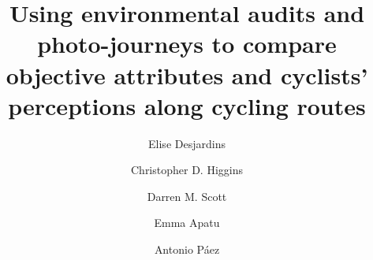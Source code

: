 \documentclass[]{elsarticle} %
\begin{document}
\begin{frontmatter}

  \title{Using environmental audits and photo-journeys to compare objective
attributes and cyclists' perceptions along cycling routes}
    \author[School of Geography and Earth Sciences]{Elise Desjardins}
    \author[Department of Human Geography]{Christopher D. Higgins}
    \author[School of Geography and Earth Sciences]{Darren M. Scott}
    \author[Department of Health Research Methods Evidence and Impact]{Emma Apatu}
    \author[School of Geography and Earth Sciences]{Antonio Páez}
      \address[School of Geography and Earth Sciences]{School of Geography and Earth Sciences, McMaster University, 1280 Main
Street West, Hamilton, Ontario L8S 4K1}
    \address[Department of Human Geography]{Department of Human Geography, University of Toronto - Scarborough, 1265
Military Trail, Toronto, Ontario M1C 1A4}
    \address[Department of Health Research Methods Evidence and Impact]{Department of Health Research Methods, Evidence, and Impact, McMaster
University, 1280 Main Street West, Hamilton, Ontario L8S 4K1}
  

\end{frontmatter}
\end{document}
